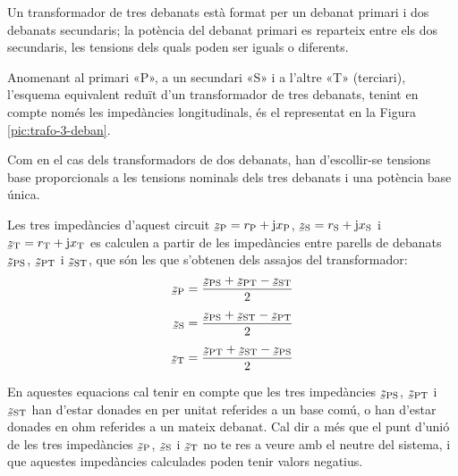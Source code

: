 Un transformador de tres debanats està format per un debanat primari i dos debanats secundaris; la potència del debanat primari es reparteix entre els dos secundaris, les tensions dels quals poden ser iguals o diferents.

Anomenant al primari «P», a un secundari «S» i a l'altre «T» (terciari), l'esquema equivalent reduït d'un transformador de tres debanats, tenint en compte només les impedàncies longitudinals,  és el representat en la Figura \vref{pic:trafo-3-deban}.

\begin{center}
    
    \label{pic:trafo-3-deban}
\end{center}

Com en el cas dels transformadors de dos debanats, han d'escollir-se tensions base proporcionals a les tensions nominals dels tres debanats i una potència base única.

Les tres impedàncies d'aquest circuit $\cmplx{z}\ped{P} = r\ped{P} + \ju x\ped{P}$, $\cmplx{z}\ped{S} = r\ped{S} + \ju x\ped{S}$ i $\cmplx{z}\ped{T} = r\ped{T} + \ju x\ped{T}$ es calculen a partir de les impedàncies entre parells de debanats $\cmplx{z}\ped{PS}$, $\cmplx{z}\ped{PT}$ i $\cmplx{z}\ped{ST}$, que són les que s'obtenen dels assajos del transformador:
\begin{subequations}
\begin{align}
    \cmplx{z}\ped{P} &= \frac{\cmplx{z}\ped{PS}+\cmplx{z}\ped{PT}-\cmplx{z}\ped{ST}}{2}  \\[1ex]
    \cmplx{z}\ped{S} &= \frac{\cmplx{z}\ped{PS}+\cmplx{z}\ped{ST}-\cmplx{z}\ped{PT}}{2}  \\[1ex]
    \cmplx{z}\ped{T} &= \frac{\cmplx{z}\ped{PT}+\cmplx{z}\ped{ST}-\cmplx{z}\ped{PS}}{2}
\end{align}
\end{subequations}

En aquestes equacions cal tenir en compte que les tres impedàncies $\cmplx{z}\ped{PS}$, $\cmplx{z}\ped{PT}$ i $\cmplx{z}\ped{ST}$ han d'estar donades en per unitat referides a un base comú, o han d'estar donades en ohm referides a un mateix debanat. Cal dir a més que el punt d'unió de les tres impedàncies $\cmplx{z}\ped{P}$, $\cmplx{z}\ped{S}$ i $\cmplx{z}\ped{T}$ no te res a veure amb el neutre del sistema, i que aquestes impedàncies calculades poden tenir valors  negatius.


